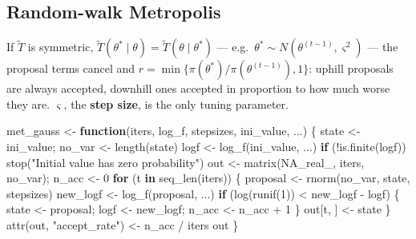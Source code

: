 \documentclass[
  letterpaper,
  DIV=11,
  numbers=noendperiod]{scrreprt}
\newenvironment{Shaded}{\begin{snugshade}}{\end{snugshade}}
\newcommand{\ConstantTok}[1]{\textcolor[rgb]{0.56,0.35,0.01}{#1}}
\newcommand{\ControlFlowTok}[1]{\textcolor[rgb]{0.00,0.23,0.31}{\textbf{#1}}}
\newcommand{\DecValTok}[1]{\textcolor[rgb]{0.68,0.00,0.00}{#1}}
\newcommand{\FunctionTok}[1]{\textcolor[rgb]{0.28,0.35,0.67}{#1}}
\newcommand{\NormalTok}[1]{\textcolor[rgb]{0.00,0.23,0.31}{#1}}
\newcommand{\OtherTok}[1]{\textcolor[rgb]{0.00,0.23,0.31}{#1}}
\newcommand{\SpecialCharTok}[1]{\textcolor[rgb]{0.37,0.37,0.37}{#1}}
\newcommand{\StringTok}[1]{\textcolor[rgb]{0.13,0.47,0.30}{#1}}
\begin{document}
\subsection{Random-walk Metropolis}\label{random-walk-metropolis}

If \(\tilde T\) is symmetric,
\(\tilde T(\theta^* \mid \theta) = \tilde T(\theta \mid \theta^*)\) ---
e.g.~\(\theta^* \sim N(\theta^{(t-1)}, \varsigma^2)\) --- the proposal
terms cancel and \(r = \min\{\pi(\theta^*)/\pi(\theta^{(t-1)}), 1\}\):
uphill proposals are always accepted, downhill ones accepted in
proportion to how much worse they are. \(\varsigma\), the \textbf{step
size}, is the only tuning parameter.

\begin{Shaded}
\begin{Highlighting}[]
\NormalTok{met\_gauss }\OtherTok{\textless{}{-}} \ControlFlowTok{function}\NormalTok{(iters, log\_f, stepsizes, ini\_value, ...) \{}
\NormalTok{    state }\OtherTok{\textless{}{-}}\NormalTok{ ini\_value; no\_var }\OtherTok{\textless{}{-}} \FunctionTok{length}\NormalTok{(state)}
\NormalTok{    logf }\OtherTok{\textless{}{-}} \FunctionTok{log\_f}\NormalTok{(ini\_value, ...)}
    \ControlFlowTok{if}\NormalTok{ (}\SpecialCharTok{!}\FunctionTok{is.finite}\NormalTok{(logf)) }\FunctionTok{stop}\NormalTok{(}\StringTok{"Initial value has zero probability"}\NormalTok{)}
\NormalTok{    out }\OtherTok{\textless{}{-}} \FunctionTok{matrix}\NormalTok{(}\ConstantTok{NA\_real\_}\NormalTok{, iters, no\_var); n\_acc }\OtherTok{\textless{}{-}} \DecValTok{0}
    \ControlFlowTok{for}\NormalTok{ (t }\ControlFlowTok{in} \FunctionTok{seq\_len}\NormalTok{(iters)) \{}
\NormalTok{        proposal }\OtherTok{\textless{}{-}} \FunctionTok{rnorm}\NormalTok{(no\_var, state, stepsizes)}
\NormalTok{        new\_logf }\OtherTok{\textless{}{-}} \FunctionTok{log\_f}\NormalTok{(proposal, ...)}
        \ControlFlowTok{if}\NormalTok{ (}\FunctionTok{log}\NormalTok{(}\FunctionTok{runif}\NormalTok{(}\DecValTok{1}\NormalTok{)) }\SpecialCharTok{\textless{}}\NormalTok{ new\_logf }\SpecialCharTok{{-}}\NormalTok{ logf) \{}
\NormalTok{            state }\OtherTok{\textless{}{-}}\NormalTok{ proposal; logf }\OtherTok{\textless{}{-}}\NormalTok{ new\_logf; n\_acc }\OtherTok{\textless{}{-}}\NormalTok{ n\_acc }\SpecialCharTok{+} \DecValTok{1}
\NormalTok{        \}}
\NormalTok{        out[t, ] }\OtherTok{\textless{}{-}}\NormalTok{ state}
\NormalTok{    \}}
    \FunctionTok{attr}\NormalTok{(out, }\StringTok{"accept\_rate"}\NormalTok{) }\OtherTok{\textless{}{-}}\NormalTok{ n\_acc }\SpecialCharTok{/}\NormalTok{ iters}
\NormalTok{    out}
\NormalTok{\}}
\end{Highlighting}
\end{Shaded}
\end{document}
